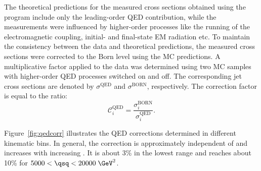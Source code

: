 The theoretical predictions for the measured cross sections obtained using the \nlojet program include only the leading-order QED contribution, while the measurements were influenced by higher-order processes like the running of the electromagnetic coupling, initial- and final-state EM radiation etc. To maintain the consistency between the data and theoretical predictions, the measured cross sections were corrected to the Born level using the MC predictions. A multiplicative factor applied to the data was determined using two \lepto MC samples with higher-order QED processes switched on and off. The corresponding jet cross sections are denoted by $\sigma^\text{QED}$ and $\sigma^\text{BORN}$, respectively. The correction factor is equal to the ratio:
\begin{equation}
 \mathcal{C}^\text{QED}_i = \frac{\sigma_i^\text{BORN}}{\sigma_i^\text{QED}}.
 \label{eq:eqdcorr}
\end{equation}

Figure~\ref{fig:qedcorr} illustrates the QED corrections determined in different kinematic bins. In general, the correction is approximately independent of \etjetb and increases with increasing \qsq. It is about 3\% in the lowest \qsq range and reaches about 10\% for $5000 < \qsq < 20000\;\GeV^2$.
 

